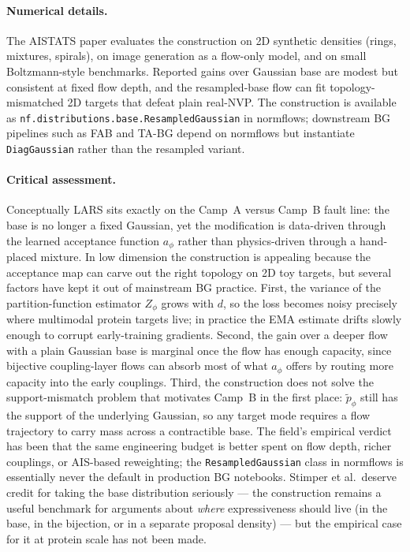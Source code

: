 \documentclass[11pt,letterpaper]{article}
\theoremstyle{plain}
\begin{document}
\paragraph{Numerical details.} The AISTATS paper evaluates the construction on
2D synthetic densities (rings, mixtures, spirals), on image generation as a
flow-only model, and on small Boltzmann-style benchmarks. Reported gains over
Gaussian base are modest but consistent at fixed flow depth, and the
resampled-base flow can fit topology-mismatched 2D targets that defeat plain
real-NVP. The construction is available as
\verb|nf.distributions.base.ResampledGaussian| in normflows; downstream BG
pipelines such as FAB and TA-BG depend on normflows but instantiate
\verb|DiagGaussian| rather than the resampled variant.

\paragraph{Critical assessment.} Conceptually LARS sits exactly on the Camp~A
versus Camp~B fault line: the base is no longer a fixed Gaussian, yet the
modification is data-driven through the learned acceptance function $a_\phi$
rather than physics-driven through a hand-placed mixture. In low dimension
the construction is appealing because the acceptance map can carve out the
right topology on 2D toy targets, but several factors have kept it out of
mainstream BG practice. First, the variance of the partition-function
estimator $Z_\phi$ grows with $d$, so the loss becomes noisy precisely where
multimodal protein targets live; in practice the EMA estimate drifts slowly
enough to corrupt early-training gradients. Second, the gain over a deeper
flow with a plain Gaussian base is marginal once the flow has enough capacity,
since bijective coupling-layer flows can absorb most of what $a_\phi$ offers by
routing more capacity into the early couplings. Third, the construction does
not solve the support-mismatch problem that motivates Camp~B in the first
place: $\tilde p_\phi$ still has the support of the underlying Gaussian, so
any target mode requires a flow trajectory to carry mass across a contractible
base. The field's empirical verdict has been that the same engineering budget
is better spent on flow depth, richer couplings, or AIS-based reweighting;
the \verb|ResampledGaussian| class in normflows is essentially never the
default in production BG notebooks. Stimper et al.\ deserve credit for taking
the base distribution seriously --- the construction remains a useful benchmark
for arguments about \emph{where} expressiveness should live (in the base, in
the bijection, or in a separate proposal density) --- but the empirical case
for it at protein scale has not been made.
\end{document}
